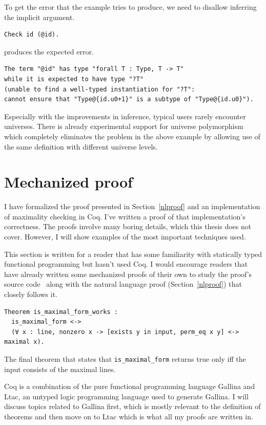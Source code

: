 \documentclass[english, 12pt, a4paper, sci, a-1b, online]{aaltothesis}
\newcommand\icoq[1]{\texttt{#1}}
\begin{document}
To get the error that the example tries to produce, we need to disallow inferring the implicit argument.
\begin{verbatim}
Check id (@id).
\end{verbatim}
produces the expected error.
\begin{verbatim}
The term "@id" has type "forall T : Type, T -> T"
while it is expected to have type "?T"
(unable to find a well-typed instantiation for "?T":
cannot ensure that "Type@{id.u0+1}" is a subtype of "Type@{id.u0}").
\end{verbatim}

Especially with the improvements in inference, typical users rarely encounter universes. There is already experimental support for universe polymorphism~\cite{coqRefman} which completely eliminates the problem in the above example by allowing use of the same definition with different universe levels.

\section{Mechanized proof}\label{mechproof}

I have formalized the proof presented in Section~\ref{nlproof} and an implementation of maximality checking in Coq. I've written a proof of that implementation's correctness. The proofs involve many boring details, which this thesis does not cover. However, I will show examples of the most important techniques used.

This section is written for a reader that has some familiarity with statically typed functional programming but hasn't used Coq. I would encourage readers that have already written some mechanized proofs of their own to study the proof's source code~\cite{source_code} along with the natural language proof (Section~\ref{nlproof}) that closely follows it.

\begin{listing}[h]
\begin{verbatim}
Theorem is_maximal_form_works :
  is_maximal_form <->
  (∀ x : line, nonzero x -> [exists y in input, perm_eq x y] <-> maximal x).
\end{verbatim}
\caption{The final theorem that states that \icoq{is_maximal_form} returns true only iff the input consists of the maximal lines.}
\end{listing}

Coq is a combination of the pure functional programming language Gallina and Ltac, an untyped logic programming language used to generate Gallina. I will discuss topics related to Gallina first, which is mostly relevant to the definition of theorems and then move on to Ltac which is what all my proofs are written in.
\end{document}
